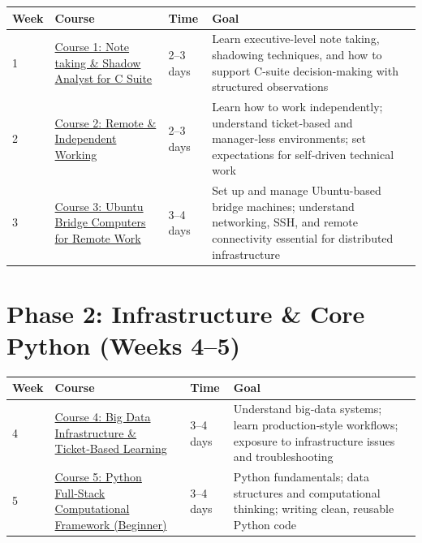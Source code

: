 \documentclass[12pt]{article}
\begin{document}
	\begin{tabularx}{\textwidth}{|X|p{3cm}|p{3cm}|X|}
		\hline
		\textbf{Week} & \textbf{Course} & \textbf{Time} & \textbf{Goal} \\
		\hline
		1 & \href{https://www.udemy.com/course/note-taking-course-and-shadow-analyst-for-c-suite-analyst/}{Course 1: Note taking \& Shadow Analyst for C Suite} & 2–3 days & Learn executive-level note taking, shadowing techniques, and how to support C-suite decision-making with structured observations \\
		\hline
		2 & \href{https://www.udemy.com/course/remote-independent-working-in-a-managerless-environment-101/}{Course 2: Remote \& Independent Working} & 2–3 days & Learn how to work independently; understand ticket‑based and manager‑less environments; set expectations for self‑driven technical work \\
		\hline
		3 & \href{https://www.udemy.com/course/connecting-managing-ubuntu-bridge-computers-for-remote-work/}{Course 3: Ubuntu Bridge Computers for Remote Work} & 3–4 days & Set up and manage Ubuntu-based bridge machines; understand networking, SSH, and remote connectivity essential for distributed infrastructure \\
		\hline
	\end{tabularx}
	
	\vspace{0.3cm}
	
	\section*{Phase 2: Infrastructure \& Core Python (Weeks 4–5)}
	
	\begin{tabularx}{\textwidth}{|X|p{3cm}|p{3cm}|X|}
		\hline
		\textbf{Week} & \textbf{Course} & \textbf{Time} & \textbf{Goal} \\
		\hline
		4 & \href{https://www.udemy.com/course/big-data-infra-admin-101-ticket-based-learning/}{Course 4: Big Data Infrastructure \& Ticket‑Based Learning} & 3–4 days & Understand big‑data systems; learn production‑style workflows; exposure to infrastructure issues and troubleshooting \\
		\hline
		5 & \href{https://www.udemy.com/course/python-full-stack-computational-framework-for-begineers-101/}{Course 5: Python Full‑Stack Computational Framework (Beginner)} & 3–4 days & Python fundamentals; data structures and computational thinking; writing clean, reusable Python code \\
		\hline
	\end{tabularx}
	
\end{document}
